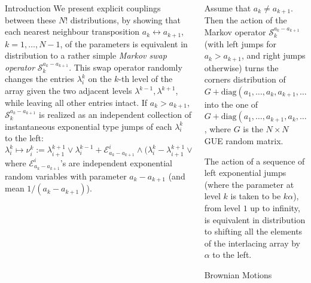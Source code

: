 \documentclass[english,final,t]{beamer}
\begin{document}
\begin{frame}{}
\begin{columns}[t]
\begin{column}{.26\linewidth}
\begin{block}{Introduction}
We present explicit couplings 
between these $N!$ distributions, 
by showing that each nearest neighbour transposition
$a_k\leftrightarrow a_{k+1}$, $k=1,\ldots,N-1 $, of the parameters
is equivalent in distribution to a 
rather simple \emph{Markov swap operator}
$\mathscr{S}^{a_k-a_{k+1}}_k$. 
This swap operator
randomly changes the entries $\lambda^k_i$
on the $k$-th level of the array given the 
two adjacent levels $\lambda^{k-1},\lambda^{k+1}$,
while leaving all other entries intact.
If $a_k>a_{k+1}$, 
$\mathscr{S}^{a_k-a_{k+1}}_k$
is realized as an independent collection of instantaneous
exponential type jumps of each $\lambda^k_i$
to the left:
\begin{equation*}
    	\lambda^{k}_i\mapsto \nu^k_i:=
	\lambda^{k+1}_{i+1}\vee \lambda^{k-1}_{i}
	+
	\mathscr{E}_{a_k-a_{k+1}}^i\wedge
	\bigl(
		\lambda^k_i-
		\lambda^{k+1}_{i+1}\vee \lambda^{k-1}_{i}
	\bigr),
\end{equation*}
where $\mathscr{E}_{a_k-a_{k+1}}^{i}$'s are independent exponential random variables
with parameter $a_k-a_{k+1}$ (and mean $1 / (a_k-a_{k+1})$).
            \end{block}
        \end{column}
    
        \begin{column}{.26\linewidth}
\begin{theorem}
    \label{thm:main_swap}
    Assume that $a_k\ne a_{k+1}$. Then the action of the Markov operator
    $\mathscr{S}^{a_k-a_{k+1}}_k$ (with left jumps for $a_k>a_{k+1}$, and right jumps otherwise)
    turns the corners distribution of $G+\mathrm{diag}(a_1,\ldots,a_k,a_{k+1},\ldots,a_N )$
    into the one of $G+\mathrm{diag}(a_1,\ldots,a_{k+1},a_{k},\ldots,a_N )$,
    where $G$ is the $N\times N$ GUE random matrix.
\end{theorem}
\begin{theorem}
    \label{thm:main_theorem_shift}
    The action of a sequence of left exponential jumps 
    (where the parameter at level $k$ is taken to be $k\alpha$), from level $1$
    up to infinity, is equivalent in distribution 
    to shifting all the 
    elements of the interlacing array by $\alpha$ to the left.
\end{theorem}
\begin{block}{Brownian Motions}
\justifying
    


\end{block}
\end{column}
\end{columns}
\end{frame}
\end{document}
